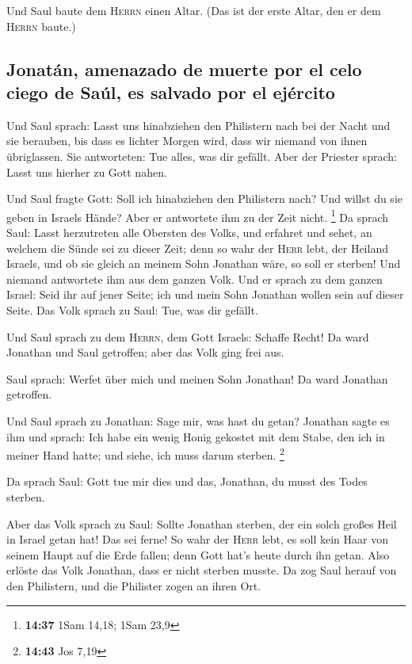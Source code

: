  Und Saul baute dem \textsc{Herrn} einen Altar. (Das ist
der erste Altar, den er dem \textsc{Herrn} baute.)

\hypertarget{jonatuxe1n-amenazado-de-muerte-por-el-celo-ciego-de-sauxfal-es-salvado-por-el-ejuxe9rcito}{%
\subsection{Jonatán, amenazado de muerte por el celo ciego de Saúl, es
salvado por el
ejército}\label{jonatuxe1n-amenazado-de-muerte-por-el-celo-ciego-de-sauxfal-es-salvado-por-el-ejuxe9rcito}}

 Und Saul sprach: Lasst uns hinabziehen den Philistern
nach bei der Nacht und sie berauben, bis dass es lichter Morgen wird,
dass wir niemand von ihnen übriglassen. Sie antworteten: Tue alles, was
dir gefällt. Aber der Priester sprach: Lasst uns hierher zu Gott nahen.

 Und Saul fragte Gott: Soll ich hinabziehen den
Philistern nach? Und willst du sie geben in Israels Hände? Aber er
antwortete ihm zu der Zeit nicht. \footnote{\textbf{14:37} 1Sam 14,18;
  1Sam 23,9}  Da sprach Saul: Lasst herzutreten alle
Obersten des Volks, und erfahret und sehet, an welchem die Sünde sei zu
dieser Zeit;  denn so wahr der \textsc{Herr} lebt, der
Heiland Israels, und ob sie gleich an meinem Sohn Jonathan wäre, so soll
er sterben! Und niemand antwortete ihm aus dem ganzen Volk.
 Und er sprach zu dem ganzen Israel: Seid ihr auf jener
Seite; ich und mein Sohn Jonathan wollen sein auf dieser Seite. Das Volk
sprach zu Saul: Tue, was dir gefällt.

 Und Saul sprach zu dem \textsc{Herrn}, dem Gott Israels:
Schaffe Recht! Da ward Jonathan und Saul getroffen; aber das Volk ging
frei aus.

 Saul sprach: Werfet über mich und meinen Sohn Jonathan!
Da ward Jonathan getroffen.

 Und Saul sprach zu Jonathan: Sage mir, was hast du
getan? Jonathan sagte es ihm und sprach: Ich habe ein wenig Honig
gekostet mit dem Stabe, den ich in meiner Hand hatte; und siehe, ich
muss darum sterben. \footnote{\textbf{14:43} Jos 7,19}

 Da sprach Saul: Gott tue mir dies und das, Jonathan, du
musst des Todes sterben.

 Aber das Volk sprach zu Saul: Sollte Jonathan sterben,
der ein solch großes Heil in Israel getan hat! Das sei ferne! So wahr
der \textsc{Herr} lebt, es soll kein Haar von seinem Haupt auf die Erde
fallen; denn Gott hat's heute durch ihn getan. Also erlöste das Volk
Jonathan, dass er nicht sterben musste.  Da zog Saul
herauf von den Philistern, und die Philister zogen an ihren Ort.

